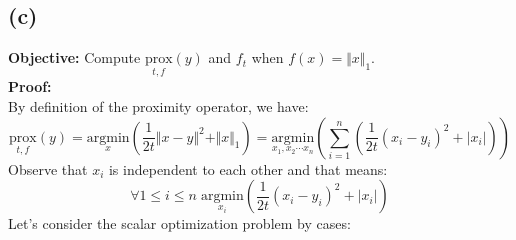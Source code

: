 \documentclass[]{article}
\begin{document}
    \subsection*{(c)}
    \textbf{Objective: }Compute $\underset{t,f}{\text{prox}}(y)$ and $f_t$ when $f(x) = \Vert x\Vert_1$.
    \\
    \textbf{Proof: }
    \\
    By definition of the proximity operator, we have: 
    \begin{equation*}\tag{1c1}\label{eqn:1c1}
        \underset{t,f}{\text{prox}}(y) = \underset{x}{\text{argmin}} \left(
            \frac{1}{2t}\Vert x - y\Vert^2 + \Vert x\Vert_1
        \right) = \underset{x_1, x_2\cdots x_n}{\text{argmin}}\left(
            \sum_{i = 1}^{n}\left(
                \frac{1}{2t}
                (x_i - y_i)^2 + |x_i|
            \right)
        \right)
    \end{equation*}
    Observe that $x_i$ is independent to each other and that means: 
    \begin{equation*}\tag{1c2}\label{eqn:1c2}
        \forall 1 \le i \le n \; \underset{x_i}{\text{argmin}}
        \left(
            \frac{1}{2t}
            (x_i - y_i)^2 + |x_i|
        \right)
    \end{equation*}
    Let's consider the scalar optimization problem by cases: 
\end{document}
